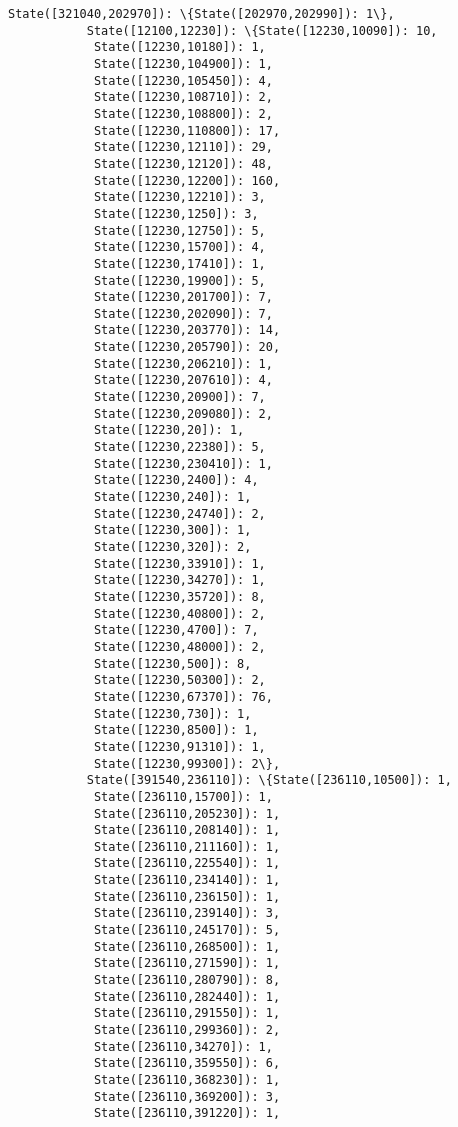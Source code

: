 \documentclass[11pt]{article}
\begin{document}
\begin{Verbatim}[commandchars=\\\{\}]
           State([321040,202970]): \{State([202970,202990]): 1\},
           State([12100,12230]): \{State([12230,10090]): 10,
            State([12230,10180]): 1,
            State([12230,104900]): 1,
            State([12230,105450]): 4,
            State([12230,108710]): 2,
            State([12230,108800]): 2,
            State([12230,110800]): 17,
            State([12230,12110]): 29,
            State([12230,12120]): 48,
            State([12230,12200]): 160,
            State([12230,12210]): 3,
            State([12230,1250]): 3,
            State([12230,12750]): 5,
            State([12230,15700]): 4,
            State([12230,17410]): 1,
            State([12230,19900]): 5,
            State([12230,201700]): 7,
            State([12230,202090]): 7,
            State([12230,203770]): 14,
            State([12230,205790]): 20,
            State([12230,206210]): 1,
            State([12230,207610]): 4,
            State([12230,20900]): 7,
            State([12230,209080]): 2,
            State([12230,20]): 1,
            State([12230,22380]): 5,
            State([12230,230410]): 1,
            State([12230,2400]): 4,
            State([12230,240]): 1,
            State([12230,24740]): 2,
            State([12230,300]): 1,
            State([12230,320]): 2,
            State([12230,33910]): 1,
            State([12230,34270]): 1,
            State([12230,35720]): 8,
            State([12230,40800]): 2,
            State([12230,4700]): 7,
            State([12230,48000]): 2,
            State([12230,500]): 8,
            State([12230,50300]): 2,
            State([12230,67370]): 76,
            State([12230,730]): 1,
            State([12230,8500]): 1,
            State([12230,91310]): 1,
            State([12230,99300]): 2\},
           State([391540,236110]): \{State([236110,10500]): 1,
            State([236110,15700]): 1,
            State([236110,205230]): 1,
            State([236110,208140]): 1,
            State([236110,211160]): 1,
            State([236110,225540]): 1,
            State([236110,234140]): 1,
            State([236110,236150]): 1,
            State([236110,239140]): 3,
            State([236110,245170]): 5,
            State([236110,268500]): 1,
            State([236110,271590]): 1,
            State([236110,280790]): 8,
            State([236110,282440]): 1,
            State([236110,291550]): 1,
            State([236110,299360]): 2,
            State([236110,34270]): 1,
            State([236110,359550]): 6,
            State([236110,368230]): 1,
            State([236110,369200]): 3,
            State([236110,391220]): 1,

\end{Verbatim}
\end{document}
